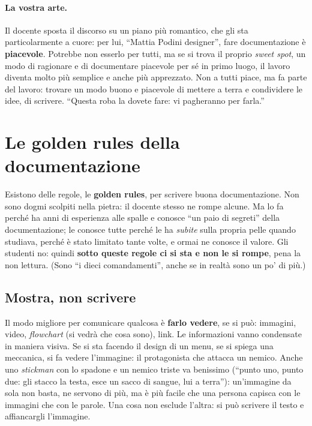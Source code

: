 \paragraph{La vostra arte.} Il docente sposta il discorso su un piano più
romantico, che gli sta particolarmente a cuore: per lui, ``Mattia Podini
designer'', fare documentazione è \textbf{piacevole}. Potrebbe non esserlo
per tutti, ma se si trova il proprio \emph{sweet spot}, un modo di ragionare e
di documentare piacevole per sé in primo luogo, il lavoro diventa molto più
semplice e anche più apprezzato. Non a tutti piace, ma fa parte del lavoro:
trovare un modo buono e piacevole di mettere a terra e condividere le idee, di
scrivere. ``Questa roba la dovete fare: vi pagheranno per farla.''

\section{Le golden rules della documentazione}
\label{sec:golden-rules}



Esistono delle regole, le \textbf{golden rules}, per scrivere buona
documentazione. Non sono dogmi scolpiti nella pietra: il docente stesso ne
rompe alcune. Ma lo fa perché ha anni di esperienza alle spalle e conosce
``un paio di segreti'' della documentazione; le conosce tutte perché le ha
\emph{subite} sulla propria pelle quando studiava, perché è stato limitato
tante volte, e ormai ne conosce il valore. Gli studenti no: quindi
\textbf{sotto queste regole ci si sta e non le si rompe}, pena la non lettura.
(Sono ``i dieci comandamenti'', anche se in realtà sono un po' di più.)

\subsection{Mostra, non scrivere}

Il modo migliore per comunicare qualcosa è \textbf{farlo vedere}, se si può:
immagini, video, \emph{flowchart} (si vedrà che cosa sono), link. Le
informazioni vanno condensate in maniera visiva. Se si sta facendo il design
di un menu, se si spiega una meccanica, si fa vedere l'immagine: il
protagonista che attacca un nemico. Anche uno \emph{stickman} con lo spadone e
un nemico triste va benissimo (``punto uno, punto due: gli stacco la testa,
esce un sacco di sangue, lui a terra''): un'immagine da sola non basta, ne
servono di più, ma è più facile che una persona capisca con le immagini che
con le parole. Una cosa non esclude l'altra: si può scrivere il testo e
affiancargli l'immagine.

